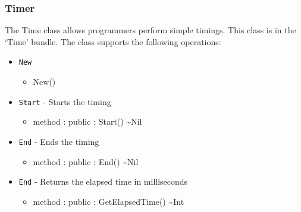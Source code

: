 \documentclass[12pt]{article}
\begin{document}
\subsubsection{Timer}
The Time class allows programmers perform simple timings.  This class is in the `Time' bundle.  The class supports the following operations:
\begin{itemize}
\item \texttt{New}
  \begin{itemize}
  \item New()
  \end{itemize}
\item \texttt{Start} - Starts the timing
  \begin{itemize}
  \item method : public : Start() \textasciitilde Nil
  \end{itemize}
\item \texttt{End} - Ends the timing
  \begin{itemize}
  \item method : public : End() \textasciitilde Nil
  \end{itemize}
\item \texttt{End} - Returns the elapsed time in milliseconds
  \begin{itemize}
  \item  method : public : GetElapsedTime() \textasciitilde Int
  \end{itemize}
\end{itemize}
\end{document}
